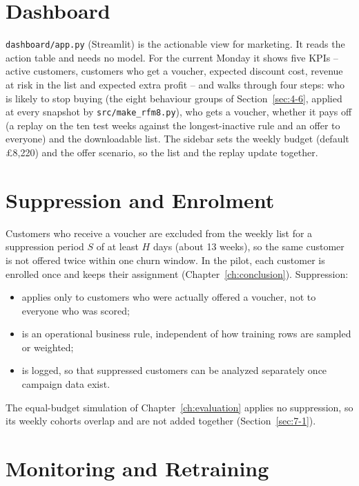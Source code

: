 \section{Dashboard}
\label{sec:8-5}

\texttt{dashboard/app.py} (Streamlit) is the actionable view for marketing. It reads the action table and needs no model. For the current Monday it shows five KPIs -- active customers, customers who get a voucher, expected discount cost, revenue at risk in the list and expected extra profit -- and walks through four steps: who is likely to stop buying (the eight behaviour groups of Section~\ref{sec:4-6}, applied at every snapshot by \texttt{src/make\_rfm8.py}), who gets a voucher, whether it pays off (a replay on the ten test weeks against the longest-inactive rule and an offer to everyone) and the downloadable list. The sidebar sets the weekly budget (default \pounds8,220) and the offer scenario, so the list and the replay update together.

\section{Suppression and Enrolment}
\label{sec:8-6}

Customers who receive a voucher are excluded from the weekly list for a suppression period $S$ of at least $H$ days (about 13 weeks), so the same customer is not offered twice within one churn window. In the pilot, each customer is enrolled once and keeps their assignment (Chapter~\ref{ch:conclusion}). Suppression:

\begin{itemize}
    \item applies only to customers who were actually offered a voucher, not to everyone who was scored;
    \item is an operational business rule, independent of how training rows are sampled or weighted;
    \item is logged, so that suppressed customers can be analyzed separately once campaign data exist.
\end{itemize}

The equal-budget simulation of Chapter~\ref{ch:evaluation} applies no suppression, so its weekly cohorts overlap and are not added together (Section~\ref{sec:7-1}).

\section{Monitoring and Retraining}
\label{sec:8-7}

